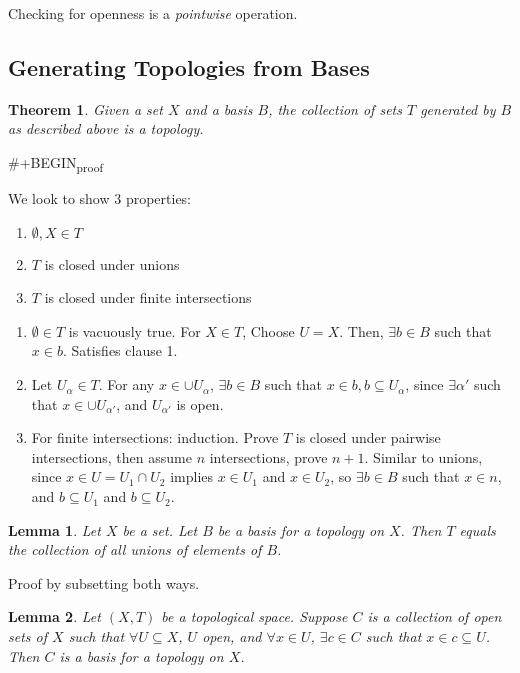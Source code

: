 \documentclass[11pt]{article}
\newtheorem{theorem}{Theorem}[section]
\newtheorem{lemma}{Lemma}[section]
\begin{document}
Checking for openness is a \textit{pointwise} operation. 

\subsection{Generating Topologies from Bases}
\label{sec:org8c71044}
\begin{theorem}


Given a set \(X\) and a basis \(B\), the collection of sets \(T\) generated
by \(B\) as described above is a topology. 
\end{theorem}

\#+BEGIN\textsubscript{proof}

We look to show 3 properties:
\begin{enumerate}
\item \(\emptyset, X \in T\)
\item \(T\) is closed under unions
\item \(T\) is closed under finite intersections
\end{enumerate}



\begin{enumerate}
\item \(\emptyset \in T\) is vacuously true. For \(X \in T\), Choose \(U =
   X\). Then, \(\exists b\in B\) such that \(x \in b\). Satisfies clause 1.
\item Let \(U_{\alpha} \in T\). For any \(x \in \cup U_{\alpha}\), \(\exists b
   \in B\) such that \(x \in b, b \subseteq U_{\alpha}\), since \(\exists
   \alpha'\) such that \(x \in \cup U_{\alpha'}\), and \(U_{\alpha'}\) is
open.
\item For finite intersections: induction. Prove \(T\) is closed under
pairwise intersections, then assume \(n\) intersections, prove \(n +
   1\). Similar to unions, since \(x \in U = U_1\cap U_2\) implies \(x \in
   U_1\) and \(x \in U_2\), so \(\exists b \in B\) such that \(x\in n\), and
\(b \subseteq U_1\) and \(b \subseteq U_2\).
\end{enumerate}


\begin{lemma}


Let \(X\) be a set. Let \(B\) be a basis for a topology on \(X\). Then \(T\)
equals the collection of all unions of elements of \(B\).
\end{lemma}

Proof by subsetting both ways. 

\begin{lemma}


Let \((X,T)\) be a topological space. Suppose \(C\) is a collection of
open sets of \(X\) such that \(\forall U \subseteq X\), \(U\) open, and
\(\forall x \in U\), \(\exists c \in C\) such that \(x \in c\subseteq
U\). Then \(C\) is a basis for a topology on \(X\). 
\end{lemma}
\end{document}
